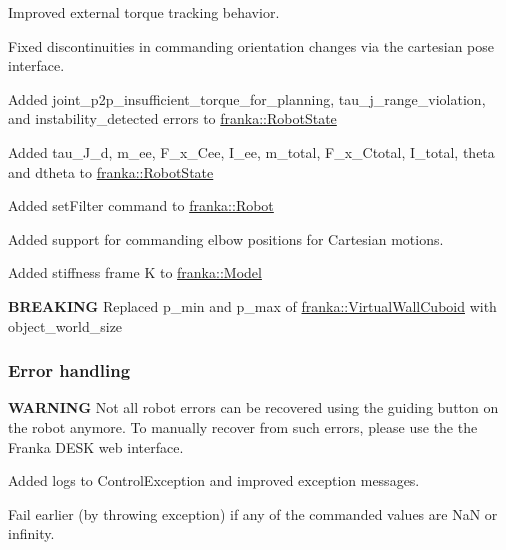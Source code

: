 \begin{DoxyItemize}
\item Improved external torque tracking behavior.
\item Fixed discontinuities in commanding orientation changes via the cartesian pose interface.
\item Added {\ttfamily joint\+\_\+p2p\+\_\+insufficient\+\_\+torque\+\_\+for\+\_\+planning}, {\ttfamily tau\+\_\+j\+\_\+range\+\_\+violation}, and {\ttfamily instability\+\_\+detected} errors to {\ttfamily \hyperlink{structfranka_1_1RobotState}{franka\+::\+Robot\+State}}
\item Added {\ttfamily tau\+\_\+\+J\+\_\+d}, {\ttfamily m\+\_\+ee}, {\ttfamily F\+\_\+x\+\_\+\+Cee}, {\ttfamily I\+\_\+ee}, {\ttfamily m\+\_\+total}, {\ttfamily F\+\_\+x\+\_\+\+Ctotal}, {\ttfamily I\+\_\+total}, {\ttfamily theta} and {\ttfamily dtheta} to {\ttfamily \hyperlink{structfranka_1_1RobotState}{franka\+::\+Robot\+State}}
\item Added {\ttfamily set\+Filter} command to {\ttfamily \hyperlink{classfranka_1_1Robot}{franka\+::\+Robot}}
\item Added support for commanding elbow positions for Cartesian motions.
\item Added stiffness frame {\ttfamily K} to {\ttfamily \hyperlink{classfranka_1_1Model}{franka\+::\+Model}}
\item {\bfseries B\+R\+E\+A\+K\+I\+NG} Replaced {\ttfamily p\+\_\+min} and {\ttfamily p\+\_\+max} of {\ttfamily \hyperlink{structfranka_1_1VirtualWallCuboid}{franka\+::\+Virtual\+Wall\+Cuboid}} with {\ttfamily object\+\_\+world\+\_\+size}
\end{DoxyItemize}

\subsubsection*{Error handling}


\begin{DoxyItemize}
\item {\bfseries W\+A\+R\+N\+I\+NG} Not all robot errors can be recovered using the guiding button on the robot anymore. To manually recover from such errors, please use the the Franka D\+E\+SK web interface.
\item Added logs to {\ttfamily Control\+Exception} and improved exception messages.
\item Fail earlier (by throwing exception) if any of the commanded values are {\ttfamily NaN} or {\ttfamily infinity}.
\end{DoxyItemize}

